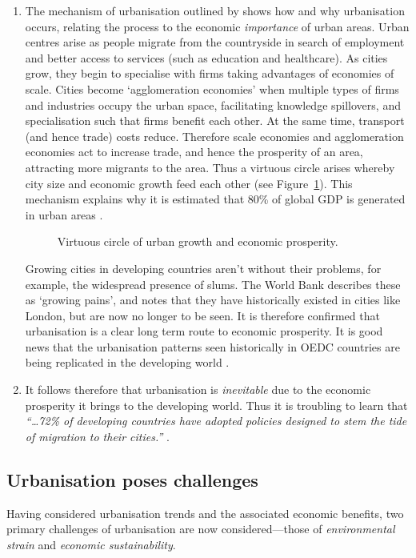 \begin{enumerate}
	\item The mechanism of urbanisation outlined by \citet{WorldBank2008a} shows how and why urbanisation occurs, relating the process to the economic \emph{importance} of urban areas. Urban centres arise as people migrate from the countryside in search of employment and better access to services (such as education and healthcare). As cities grow, they begin to specialise with firms taking advantages of economies of scale. Cities become `agglomeration economies' when multiple types of firms and industries occupy the urban space, facilitating knowledge spillovers, and specialisation such that firms benefit each other. At the same time, transport (and hence trade) costs reduce. Therefore scale economies and agglomeration economies act to increase trade, and hence the prosperity of an area, attracting more migrants to the area. Thus a virtuous circle arises whereby city size and economic growth feed each other (see Figure~\ref{fig:urbanCycle}). This mechanism explains why it is estimated that 80\% of global GDP is generated in urban areas \citep{AREAS2012}.

\begin{figure}[h]
	\centering
	
	\caption{Virtuous circle of urban growth and economic prosperity.} \label{fig:urbanCycle}
\end{figure}
Growing cities in developing countries aren't without their problems, for example, the widespread presence of slums. The World Bank describes these as `growing pains', and notes that they have historically existed in cities like London, but are now no longer to be seen. It is therefore confirmed that urbanisation is a clear long term route to economic prosperity. It is good news that the urbanisation patterns seen historically in OEDC countries are being replicated in the developing world \citep{WorldBank2008a}. 

	\item It follows therefore that urbanisation is \emph{inevitable} due to the economic prosperity it brings to the developing world. Thus it is troubling to learn that \emph{``\ldots 72\% of developing countries have adopted policies designed to stem the tide of migration to their cities.''} \citep{Donald2012}.
\end{enumerate}


\subsection{Urbanisation poses challenges} \label{sec:urban_challenges}
Having considered urbanisation trends and the associated economic benefits, two primary challenges of urbanisation are now considered---those of \emph{environmental strain} and \emph{economic sustainability}.

